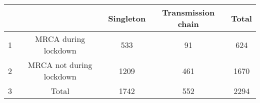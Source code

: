 \begin{tabular}{lcccc}
  \hline
 &  & Singleton & Transmission chain & Total \\ 
  \hline
1 & MRCA during lockdown & 533 &  91 & 624 \\ 
  2 & MRCA not during lockdown & 1209 & 461 & 1670 \\ 
  3 & Total & 1742 & 552 & 2294 \\ 
   \hline
\end{tabular}

